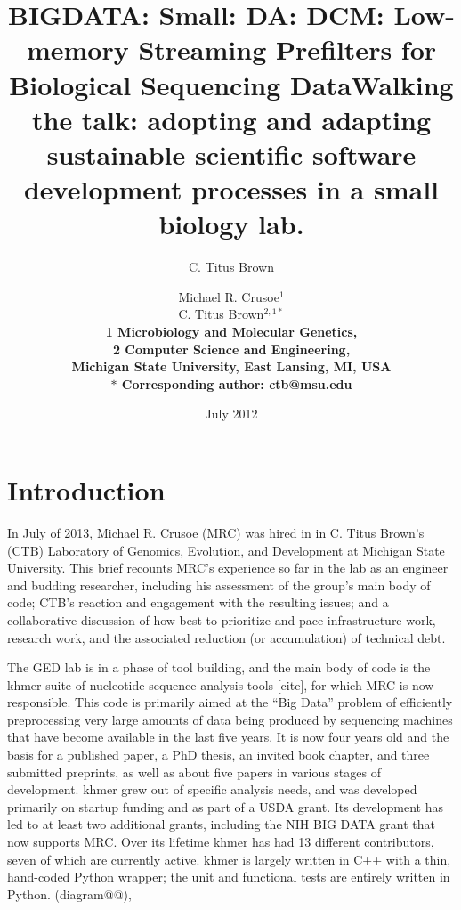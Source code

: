 \documentclass[11pt]{article}
\title{BIGDATA: Small: DA: DCM: Low-memory Streaming Prefilters for
Biological Sequencing Data}
\author{C. Titus Brown}
\date{July 2012}
\title{Walking the talk: adopting and adapting sustainable scientific software
  development processes in a small biology lab.}
\author{Michael R. Crusoe$^{1}$\\
C. Titus Brown$^{2,1\ast}$\\
\small \bf{1} Microbiology and Molecular Genetics,\\
\small \bf{2} Computer Science and Engineering,\\
\small Michigan State University, East Lansing, MI, USA\\
\small $\ast$ Corresponding author: ctb@msu.edu}
\begin{document}
\maketitle


\setlength{\parindent}{0pt}
\setlength{\parindent}{0pt}
\setlength{\parskip}{0.70ex}

\section{Introduction}

In July of 2013, Michael R. Crusoe (MRC) was hired in in C. Titus
Brown's (CTB) Laboratory of Genomics, Evolution, and Development at
Michigan State University.  This brief recounts MRC's experience so
far in the lab as an engineer and budding researcher, including his
assessment of the group's main body of code; CTB's reaction and
engagement with the resulting issues; and a collaborative discussion
of how best to prioritize and pace infrastructure work, research work,
and the associated reduction (or accumulation) of technical debt.

The GED lab is in a phase of tool building, and the main body of code
is the khmer suite of nucleotide sequence analysis tools [cite], for
which MRC is now responsible.  This code is primarily aimed at the
``Big Data'' problem of efficiently preprocessing very large amounts
of data being produced by sequencing machines that have become
available in the last five years.  It is now four years old and the
basis for a published paper, a PhD thesis, an invited book chapter,
and three submitted preprints, as well as about five papers in various
stages of development.  khmer grew out of specific analysis needs, and
was developed primarily on startup funding and as part of a USDA
grant.  Its development has led to at least two additional grants,
including the NIH BIG DATA grant that now supports MRC.  Over its
lifetime khmer has had 13 different contributors, seven of which are
currently active.  khmer is largely written in C++ with a thin,
hand-coded Python wrapper; the unit and functional tests are entirely
written in Python.  (diagram@@),
\end{document}
